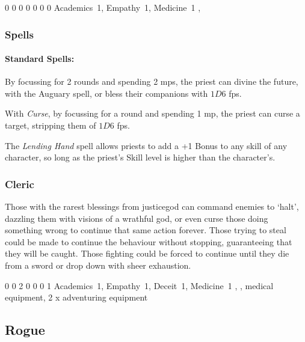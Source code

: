 {\begin{multicols}{2}
{0}%
{0}%
{{0}%
{0}%
{0}}%
{0}%
{0}%
{Academics~1, Empathy~1, Medicine~1
}%
{\quarterstaff, \partialleather}%
{\addtocounter{fp}{5}}


\subsubsection{Spells}

\paragraph{Standard Spells:}

By focussing for 2 rounds and spending 2 \glspl{mp}, the priest can divine the future, with the Auguary spell, or bless their companions with $1D6$ \glspl{fp}.

With \textit{Curse}, by focussing for a round and spending 1 \gls{mp}, the priest can curse a target, stripping them of $1D6$ \glspl{fp}.

The \textit{Lending Hand} spell allows priests to add a +1 Bonus to any skill of any character, so long as the priest's Skill level is higher than the character's.

\subsubsection{Cleric}

Those with the rarest blessings from \gls{justicegod} can command enemies to `halt', dazzling them with visions of a wrathful god, or even curse those doing something wrong to continue that same action forever.
Those trying to steal could be made to continue the behaviour without stopping, guaranteeing that they will be caught.
Those fighting could be forced to continue until they die from a sword or drop down with sheer exhaustion.


{0}%
{0}%
{{2}%
{0}%
{0}}%
{0}%
{1}%
{Academics~1, Empathy~1, Deceit~1, Medicine~1
\knacks{\combatcaster}
}%
{\quarterstaff, \partialchain, medical equipment, 2 x adventuring equipment}%
{\addtocounter{fp}{5}}

\subsection{Rogue}


\end{multicols}}
